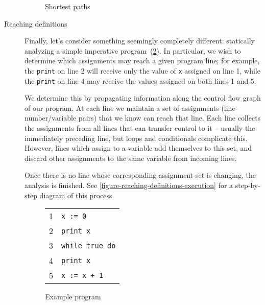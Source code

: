 \begin{description}
\begin{figure}[pth]
  \centering
  \XXX
  \caption{Shortest paths}
  \label{figure-shortest-paths}
\end{figure}


\item[Reaching definitions]
%
Finally, let's consider something seemingly completely different: statically
analyzing a simple imperative program~(\cref{figure-reaching-definitions}).
%
%
In particular, we wish to determine which assignments may reach a given program
line; for example, the \texttt{print} on line 2 will receive only the value of
\texttt{x} assigned on line 1, while the \texttt{print} on line 4 may receive
the values assigned on both lines 1 and 5.

We determine this by propagating information along the control flow graph of our
program.
%
At each line we maintain a set of assignments (line-number/variable pairs) that
we know can reach that line.
%
Each line collects the assignments from all lines that can transfer control to
it -- usually the immediately preceding line, but loops and conditionals
complicate this.
%
However, lines which assign to a variable add themselves to this set, and discard other assignments to the same variable from incoming lines.

Once there is no line whose corresponding assignment-set is changing, the analysis is finished.
%
See \cref{figure-reaching-definitions-execution} for a step-by-step diagram of this process. 

\begin{figure}[pt]
  \centering
  \ttfamily
  \begin{tabular}{cl}
    1 & \tt x := 0\\
    2 & \tt print x\\
    3 & \tt while true do\\
    4 & \tt\quad print x\\
    5 & \tt\quad x := x + 1
  \end{tabular}
  \caption{Example program}
  \label{figure-reaching-definitions}
\end{figure}



\end{description}

